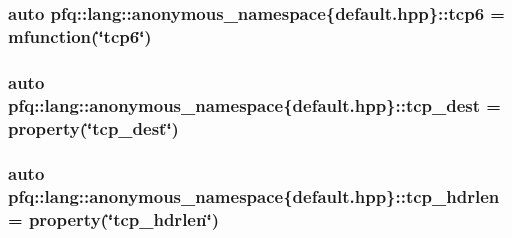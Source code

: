 \hypertarget{namespacepfq_1_1lang_1_1anonymous__namespace_02default_8hpp_03_ad5806a9b77c5975d08f0d0d317faa7a0}{
\subsubsection[{tcp6}]{\setlength{\rightskip}{0pt plus 5cm}auto pfq\+::lang\+::anonymous\+\_\+namespace\{default.\+hpp\}\+::tcp6 = {\bf mfunction}(\char`\"{}tcp6\char`\"{})}}\label{namespacepfq_1_1lang_1_1anonymous__namespace_02default_8hpp_03_ad5806a9b77c5975d08f0d0d317faa7a0}
\hypertarget{namespacepfq_1_1lang_1_1anonymous__namespace_02default_8hpp_03_a83741c074712431d2e75f09744bb7486}{
\subsubsection[{tcp\+\_\+dest}]{\setlength{\rightskip}{0pt plus 5cm}auto pfq\+::lang\+::anonymous\+\_\+namespace\{default.\+hpp\}\+::tcp\+\_\+dest = {\bf property}(\char`\"{}tcp\+\_\+dest\char`\"{})}}\label{namespacepfq_1_1lang_1_1anonymous__namespace_02default_8hpp_03_a83741c074712431d2e75f09744bb7486}
\hypertarget{namespacepfq_1_1lang_1_1anonymous__namespace_02default_8hpp_03_a678163384b58e4682bdbaf7efdd22cfb}{
\subsubsection[{tcp\+\_\+hdrlen}]{\setlength{\rightskip}{0pt plus 5cm}auto pfq\+::lang\+::anonymous\+\_\+namespace\{default.\+hpp\}\+::tcp\+\_\+hdrlen = {\bf property}(\char`\"{}tcp\+\_\+hdrlen\char`\"{})}}\label{namespacepfq_1_1lang_1_1anonymous__namespace_02default_8hpp_03_a678163384b58e4682bdbaf7efdd22cfb}
